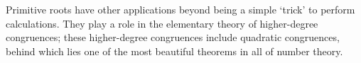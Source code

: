 \documentclass[a4paper]{article}
\begin{document}
Primitive roots have other applications beyond being a simple `trick' to perform calculations. They play a role in the elementary
theory of higher-degree congruences; these higher-degree congruences include quadratic congruences, behind which lies one of
the most beautiful theorems in all of number theory.
\end{document}
